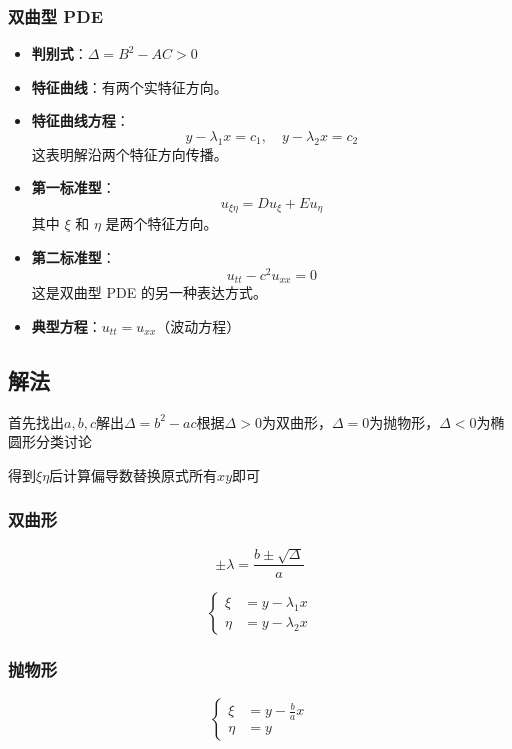 \subsubsection{双曲型 PDE}
\begin{itemize}
    \item \textbf{判别式}：$\Delta = B^2 - AC > 0$  
    \item \textbf{特征曲线}：有两个实特征方向。  
    \item \textbf{特征曲线方程}：
    \[
    y - \lambda_1 x = c_1, \quad y - \lambda_2 x = c_2
    \]
    这表明解沿两个特征方向传播。
    \item \textbf{第一标准型}：
    \[
    u_{\xi \eta} = D u_{\xi} + E u_{\eta}
    \]
    其中 $\xi$ 和 $\eta$ 是两个特征方向。
    \item \textbf{第二标准型}：
    \[
    u_{tt} - c^2 u_{xx} = 0
    \]
    这是双曲型 PDE 的另一种表达方式。
    \item \textbf{典型方程}：$u_{tt} = u_{xx}$（波动方程）
\end{itemize}

\subsection{解法}

首先找出$a,b,c$解出$\Delta = b^2 - ac$根据$\Delta > 0$为双曲形，$\Delta = 0$为抛物形，$\Delta < 0$为椭圆形分类讨论

得到$\xi \eta$后计算偏导数替换原式所有$xy$即可

\subsubsection{双曲形}

\[
\pm \lambda = \frac{b \pm \sqrt{\Delta}}{a}
\]

\[
\left\{
\begin{aligned}
\xi &= y - \lambda_1 x \\
\eta &= y - \lambda_2 x
\end{aligned}
\right.
\]

\subsubsection{抛物形}

\[
\left\{
\begin{aligned}
\xi &= y - \frac{b}{a} x \\
\eta &= y
\end{aligned}
\right.
\]


